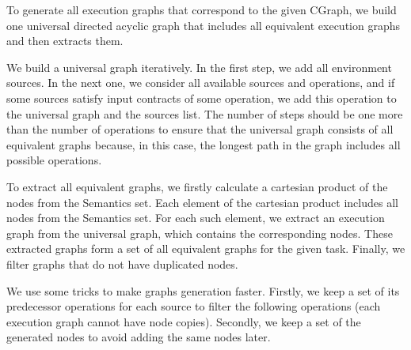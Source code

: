 To generate all execution graphs that correspond to the given CGraph, we build one universal directed acyclic graph that includes all equivalent execution graphs and then extracts them.





We build a universal graph iteratively.
In the first step, we add all environment sources.
In the next one, we consider all available sources and operations, and if some sources satisfy input contracts of some operation, we add this operation to the universal graph and the sources list.
The number of steps should be one more than the number of operations to ensure that the universal graph consists of all equivalent graphs because, in this case, the longest path in the graph includes all possible operations.

To extract all equivalent graphs, we firstly calculate a cartesian product of the nodes from the Semantics set.
Each element of the cartesian product includes all nodes from the Semantics set.
For each such element, we extract an execution graph from the universal graph, which contains the corresponding nodes.
These extracted graphs form a set of all equivalent graphs for the given task.
Finally, we filter graphs that do not have duplicated nodes.


We use some tricks to make graphs generation faster.
Firstly, we keep a set of its predecessor operations for each source to filter the following operations (each execution graph cannot have node copies).
Secondly, we keep a set of the generated nodes to avoid adding the same nodes later.



